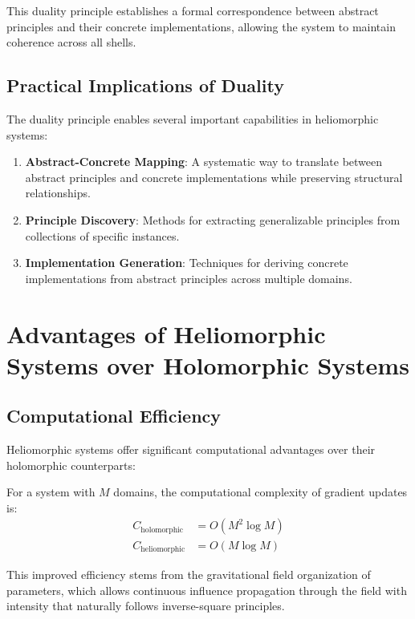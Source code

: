 \begin{definition}
\begin{theorem}
This duality principle establishes a formal correspondence between abstract principles and their concrete implementations, allowing the system to maintain coherence across all shells.

\subsection{Practical Implications of Duality}

The duality principle enables several important capabilities in heliomorphic systems:

\begin{enumerate}
    \item \textbf{Abstract-Concrete Mapping}: A systematic way to translate between abstract principles and concrete implementations while preserving structural relationships.
    
    \item \textbf{Principle Discovery}: Methods for extracting generalizable principles from collections of specific instances.
    
    \item \textbf{Implementation Generation}: Techniques for deriving concrete implementations from abstract principles across multiple domains.
\end{enumerate}

\section{Advantages of Heliomorphic Systems over Holomorphic Systems}

\subsection{Computational Efficiency}

Heliomorphic systems offer significant computational advantages over their holomorphic counterparts:

\begin{proposition}
For a system with $M$ domains, the computational complexity of gradient updates is:
\begin{align}
C_{\text{holomorphic}} &= O(M^2 \log M) \\
C_{\text{heliomorphic}} &= O(M \log M)
\end{align}
\end{proposition}

This improved efficiency stems from the gravitational field organization of parameters, which allows continuous influence propagation through the field with intensity that naturally follows inverse-square principles.


\end{theorem}
\end{definition}
